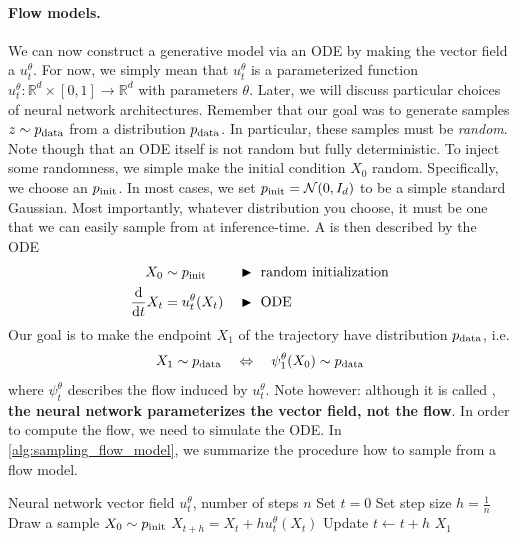 \paragraph{Flow models.} We can now construct a generative model via an ODE by making the vector field a  $u_t^\theta$. For now, we simply mean that $u_t^\theta$ is a parameterized function  $u_t^\theta:\mathbb{R}^d\times [0,1]\to\mathbb{R}^d$ with parameters $\theta$. Later, we will discuss particular choices of neural network architectures. Remember that our goal was to generate samples $z\sim p_{\rm{data}}$ from a distribution $p_{\rm{data}}$. In particular, these samples must be \emph{random}. Note though that an ODE itself is not random but fully deterministic. To inject some randomness, we simple make the initial condition $X_0$ random. Specifically, we choose an  $p_{\rm{init}}$. In most cases, we set $p_{\rm{init}}=\mathcal{N}(0,I_d)$ to be a simple standard Gaussian. Most importantly, whatever distribution you choose, it must be one that we can easily sample from at inference-time. A  is then described by the ODE
\begin{align*}
    X_0 &\sim p_{\rm{init}}  &&\blacktriangleright\,\,\text{random initialization} \\
    \frac{\mathrm{d}}{\mathrm{d} t}X_t &= u_t^\theta(X_t) &&\blacktriangleright\,\,\text{ODE}
\end{align*}
Our goal is to make the endpoint  $X_1$ of the trajectory have distribution $p_{\rm{data}}$, i.e.
\begin{align*}
    X_1 \sim p_{\rm{data}} \quad \Leftrightarrow \quad \psi_1^\theta(X_0)\sim p_{\rm{data}}
\end{align*}
where $\psi_t^\theta$ describes the flow induced by $u_t^\theta$. Note however: although it is called , \textbf{the neural network parameterizes the vector field, not the flow}. In order to compute the flow, we need to simulate the ODE. In \cref{alg:sampling_flow_model}, we summarize the procedure how to sample from a flow model.

\begin{algorithm}[h]
\caption{Sampling from a Flow Model with Euler method}
\label{alg:sampling_flow_model}
\begin{algorithmic}[1]
\REQUIRE Neural network vector field $u_t^\theta$, number of steps $n$
\STATE Set $t=0$
\STATE Set step size $h=\frac{1}{n}$
\STATE Draw a sample $X_0\sim p_{\rm{init}}$
    \STATE $X_{t+h} = X_{t} + h u_t^\theta(X_t)$
    \STATE Update $t\leftarrow t+h$
\ENDFOR
\RETURN $X_1$
\end{algorithmic}
\end{algorithm}

